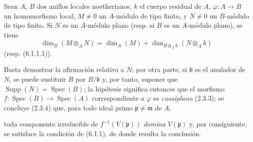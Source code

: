 \begin{corollary}[6.1.2]
\label{IV.2.s6.1.2-fr}
Sean $A$, $B$ dos anillos locales noetherianos, $k$ el cuerpo residual de
$A$, $\varphi:A\to B$ un homomorfismo local, $M\neq0$ un $A$-módulo de tipo
finito, y $N\neq0$ un $B$-módulo de tipo finito. Si $N$ es un $A$-módulo plano
\textup{(resp.} si $B$ es un $A$-módulo plano), se tiene
\begin{equation}
\dim_B(M\otimes_A N)=\dim_A(M)+
\dim_{B\otimes_Ak}(N\otimes_Ak)
\tag{6.1.2.1}\label{IV.2.s6.1.2.1-fr}
\end{equation}
\textup{(resp. (6.1.1.1))}.
\end{corollary}

Basta demostrar la afirmación relativa a $N$; por otra parte, si
$\mathfrak b$ es el anulador de $N$, se puede sustituir $B$ por
$B/\mathfrak b$ y, por tanto, suponer que
$\operatorname{Supp}(N)=\operatorname{Spec}(B)$; la hipótesis significa
entonces que el morfismo $f:\operatorname{Spec}(B)\to\operatorname{Spec}(A)$
correspondiente a $\varphi$ es \emph{cuasiplano} (2.3.3); se concluye
(2.3.4) que, para todo ideal primo $\mathfrak p\neq\mathfrak m$ de $A$,


toda componente irreducible de $f^{-1}(V(\mathfrak p))$ \emph{domina}
$V(\mathfrak p)$ y, por consiguiente, se satisface la condición de (6.1.1),
de donde resulta la conclusión.
